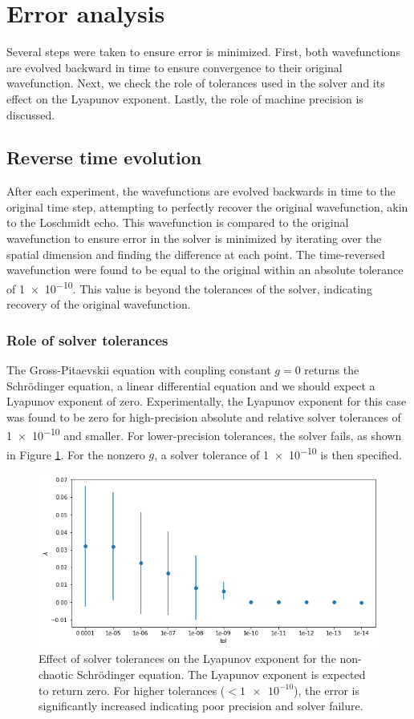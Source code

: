 \section{Error analysis}
Several steps were taken to ensure error is minimized. First, both wavefunctions are evolved backward in time to ensure convergence to their original wavefunction. Next, we check the role of tolerances used in the solver and its effect on the Lyapunov exponent. Lastly, the role of machine precision is discussed.


\subsection{Reverse time evolution}
After each experiment, the wavefunctions are evolved backwards in time to the original time step, attempting to perfectly recover the original wavefunction, akin to the Loschmidt echo. This wavefunction is compared to the original wavefunction to ensure error in the solver is minimized by iterating over the spatial dimension and finding the difference at each point. The time-reversed wavefunction were found to be equal to the original within an absolute tolerance of \num{1e-10}. This value is beyond the tolerances of the solver, indicating recovery of the original wavefunction.


\subsubsection{Role of solver tolerances}
The Gross-Pitaevskii equation with coupling constant $g=0$ returns the Schr\"odinger equation, a linear differential equation and we should expect a Lyapunov exponent of zero. Experimentally, the Lyapunov exponent for this case was found to be zero for high-precision absolute and relative solver tolerances of \num{1e-10} and smaller. For lower-precision tolerances, the solver fails, as shown in Figure \ref{fig:tollam}. For the nonzero $g$, a solver tolerance of \num{1e-10} is then specified.

\begin{figure}[p]
	\centering
	\includegraphics[width=\linewidth]{chapter4/tol_lam}
	\caption{Effect of solver tolerances on the Lyapunov exponent for the non-chaotic Schr\"odinger equation. The Lyapunov exponent is expected to return zero. For higher tolerances ($<\num{1e-10}$), the error is significantly increased indicating poor precision and solver failure.}
	\label{fig:tollam}
\end{figure}

